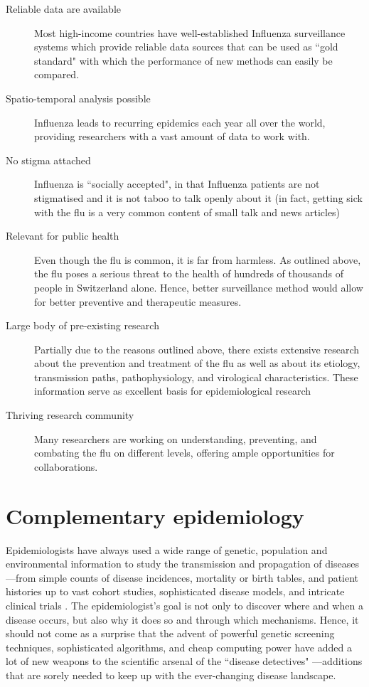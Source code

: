 \documentclass[11pt, a4paper,twoside]{report}\usepackage[]{graphicx}\usepackage[]{color}
\begin{document}
\begin{description}
\item [Reliable data are available] Most high-income countries have well-established Influenza surveillance systems which provide reliable data sources that can be used as ``gold standard" with which the performance of new methods can easily be compared.
\item [Spatio-temporal analysis possible] Influenza leads to recurring epidemics each year all over the world, providing researchers with a vast amount of data to work with.
\item [No stigma attached] Influenza is ``socially accepted", in that Influenza patients are not stigmatised and it is not taboo to talk openly about it (in fact, getting sick with the flu is a very common content of small talk and news articles)
\item [Relevant for public health ] Even though the flu is common, it is far from harmless. As outlined above, the flu poses a serious threat to the health of hundreds of thousands of people in Switzerland alone. Hence, better surveillance method would allow for better preventive and therapeutic measures.
\item [Large body of pre-existing research] Partially due to the reasons outlined above, there exists extensive research about the prevention and treatment of the flu as well as about its etiology, transmission paths, pathophysiology, and virological characteristics. These information serve as excellent basis for epidemiological research
\item [Thriving research community] Many researchers are working on understanding, preventing, and combating the flu on different levels, offering ample opportunities for collaborations.
\end{description}

\section{Complementary epidemiology}
Epidemiologists have always used a wide range of genetic, population and environmental information to study the transmission and propagation of diseases---from simple counts of disease incidences, mortality or birth tables, and patient histories up to vast cohort studies, sophisticated disease models, and intricate clinical trials \citep{rothman2012epidemiology,koepsell2014epidemiologic}. The epidemiologist's goal is not only to discover where and when a disease occurs, but also why it does so and through which mechanisms. Hence, it should not come as a surprise that the advent of powerful genetic screening techniques, sophisticated algorithms, and cheap computing power have added a lot of new weapons to the scientific arsenal of the ``disease detectives" \citep{bailey2005introduction, khoury_transforming_2013, gardy_real-time_2015}---additions that are sorely needed to keep up with the ever-changing disease landscape.
\end{document}
